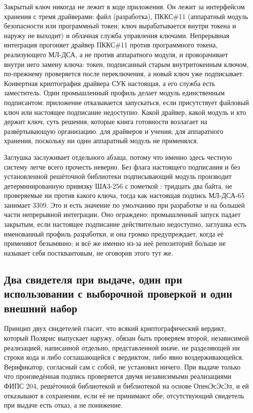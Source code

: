 Закрытый ключ никогда не лежит в коде приложения. Он лежит за интерфейсом хранения с тремя
драйверами: файл (разработка), ПККС\#11 (аппаратный модуль безопасности или программный токен;
ключ вырабатывается внутри токена и наружу не выходит) и облачная служба управления ключами.
Непрерывная интеграция прогоняет драйвер ПККС\#11 против программного токена, реализующего МЛ-ДСА,
а не против аппаратного модуля, и проворачивает внутри него замену ключа: токен, подписанный
старым внутритокенным ключом, по-прежнему проверяется после переключения, а новый ключ уже
подписывает. Конвертная криптография драйвера СУК настоящая, а его служба есть заместитель. Один
промышленный профиль делает модуль единственным подписантом: приложение отказывается
запускаться, если присутствует файловый ключ или настоящее подписание недоступно. Какой драйвер,
какой модуль и кто держит ключ, суть решения, которые книга готовности возлагает на
развёртывающую организацию. \sImplMark{} для драйверов и учения; \sExt{} для аппаратного хранения,
поскольку ни один аппаратный модуль не применялся.

Заглушка заслуживает отдельного абзаца, потому что именно здесь честную систему легче всего
прочесть неверно. Без флага настоящего
подписания и без установленной решёточной библиотеки подписывающий модуль производит
детерминированную привязку ША3-256 с пометкой
: тридцать два байта, не проверяемые ни против какого
ключа, тогда как настоящая подпись МЛ-ДСА-65 занимает 3309. Это и есть значение по умолчанию при
разработке и на большей части непрерывной интеграции. Оно ограждено: промышленный запуск
падает закрытым, если настоящее подписание действительно недоступно, заглушка
есть именованный профиль разработки, и она громко предупреждает, когда её применяют безымянно; и
всё же именно из-за неё репозиторий больше не называет себя постквантовым, не оговорив этого тут
же. \sImpl

\subsection{Два свидетеля при выдаче, один при использовании с выборочной проверкой и один внешний набор}

Принцип двух свидетелей гласит, что всякий криптографический вердикт, который Полярис выпускает
наружу, обязан быть проверяем второй, независимой реализацией, написанной отдельно, представленной
иначе, не разделяющей ни строки кода и либо соглашающейся с вердиктом, либо явно воздерживающейся.
Верификатор, согласный сам с собой, не установил ничего. При выдаче только что произведённая
подпись проверяется двумя независимыми реализациями ФИПС 204, решёточной библиотекой и
библиотекой на основе ОпенЭсЭсЭл, и ей отказывают в сохранении, если её не принимают обе;
отсутствующий свидетель при выдаче есть отказ, а не понижение. \sImpl

